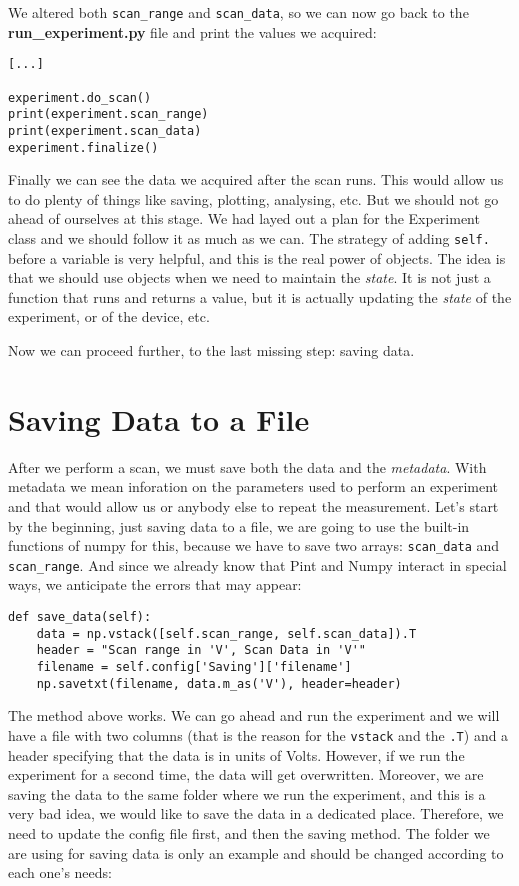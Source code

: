 We altered both \texttt{scan\_range} and \texttt{scan\_data}, so we can now go back to the \textbf{run\_experiment.py} file and print the values we acquired:

\begin{verbatim}
[...]

experiment.do_scan()
print(experiment.scan_range)
print(experiment.scan_data)
experiment.finalize()
\end{verbatim}

Finally we can see the data we acquired after the scan runs. This would allow us to do plenty of things like saving, plotting, analysing, etc. But we should not go ahead of ourselves at this stage. We had layed out a plan for the Experiment class and we should follow it as much as we can. The strategy of adding \texttt{self.} before a variable is very helpful, and this is the real power of objects. The idea is that we should use objects when we need to maintain the \emph{state}. It is not just a function that runs and returns a value, but it is actually updating the \emph{state} of the experiment, or of the device, etc.

Now we can proceed further, to the last missing step: saving data.

\section{Saving Data to a File}\label{section:saving-data}
After we perform a scan, we must save both the data and the \emph{metadata}. With metadata we mean inforation on the parameters used to perform an experiment and that would allow us or anybody else to repeat the measurement. Let's start by the beginning, just saving data to a file, we are going to use the built-in functions of numpy for this, because we have to save two arrays: \texttt{scan\_data} and \texttt{scan\_range}. And since we already know that Pint and Numpy interact in special ways, we anticipate the errors that may appear:

\begin{verbatim}
def save_data(self):
	data = np.vstack([self.scan_range, self.scan_data]).T
    header = "Scan range in 'V', Scan Data in 'V'"
    filename = self.config['Saving']['filename']
    np.savetxt(filename, data.m_as('V'), header=header)
\end{verbatim}

The method above works. We can go ahead and run the experiment and we will have a file with two columns (that is the reason for the \texttt{vstack} and the \texttt{.T}) and a header specifying that the data is in units of Volts. However, if we run the experiment for a second time, the data will get overwritten. Moreover, we are saving the data to the same folder where we run the experiment, and this is a very bad idea, we would like to save the data in a dedicated place. Therefore, we need to update the config file first, and then the saving method. The folder we are using for saving data is only an example and should be changed according to each one's needs:

